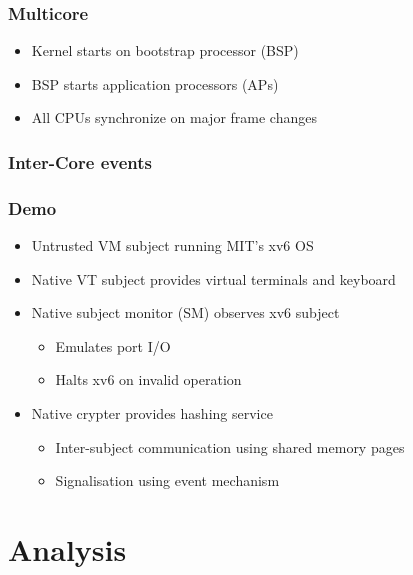 \documentclass[xcolor={dvipsnames}]{beamer}
\begin{document}
\begin{frame}\frametitle{Multicore}
\begin{itemize}
	\item Kernel starts on bootstrap processor (BSP)
	\item BSP starts application processors (APs)
	\item All CPUs synchronize on major frame changes
\end{itemize}
\begin{center}
	
\end{center}
\end{frame}

\begin{frame}\frametitle{Inter-Core events}
\begin{center}
	
\end{center}
\end{frame}

\begin{frame}\frametitle{Demo}
\begin{itemize}
	\item Untrusted VM subject running MIT's xv6 OS
	\item Native VT subject provides virtual terminals and keyboard
	\item Native subject monitor (SM) observes xv6 subject
	\begin{itemize}
		\item Emulates port I/O
		\item Halts xv6 on invalid operation
	\end{itemize}
	\item Native crypter provides hashing service
	\begin{itemize}
		\item Inter-subject communication using shared memory pages
		\item Signalisation using event mechanism
	\end{itemize}
\end{itemize}
\begin{center}
	
\end{center}
\end{frame}

\section{Analysis}
\end{document}
